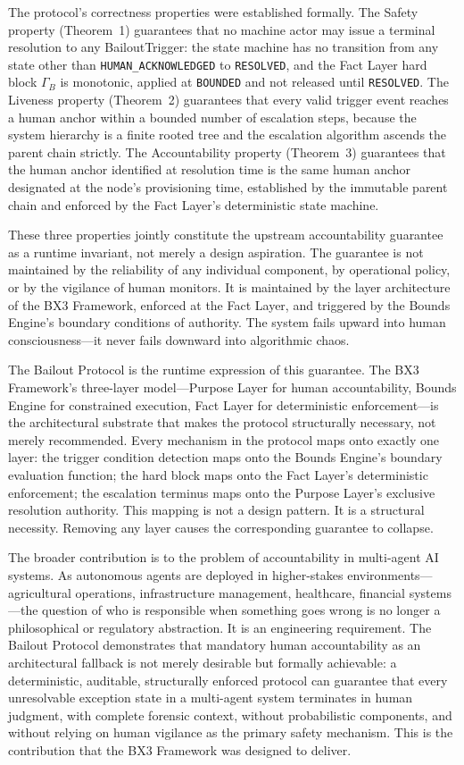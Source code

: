 The protocol's correctness properties were established formally. The Safety property (Theorem~1) guarantees that no machine actor may issue a terminal resolution to any BailoutTrigger: the state machine has no transition from any state other than \texttt{HUMAN\_ACKNOWLEDGED} to \texttt{RESOLVED}, and the Fact Layer hard block $\Gamma_B$ is monotonic, applied at \texttt{BOUNDED} and not released until \texttt{RESOLVED}. The Liveness property (Theorem~2) guarantees that every valid trigger event reaches a human anchor within a bounded number of escalation steps, because the system hierarchy is a finite rooted tree and the escalation algorithm ascends the parent chain strictly. The Accountability property (Theorem~3) guarantees that the human anchor identified at resolution time is the same human anchor designated at the node's provisioning time, established by the immutable parent chain and enforced by the Fact Layer's deterministic state machine.

These three properties jointly constitute the upstream accountability guarantee as a runtime invariant, not merely a design aspiration. The guarantee is not maintained by the reliability of any individual component, by operational policy, or by the vigilance of human monitors. It is maintained by the layer architecture of the BX3 Framework, enforced at the Fact Layer, and triggered by the Bounds Engine's boundary conditions of authority. The system fails upward into human consciousness---it never fails downward into algorithmic chaos.

The Bailout Protocol is the runtime expression of this guarantee. The BX3 Framework's three-layer model---Purpose Layer for human accountability, Bounds Engine for constrained execution, Fact Layer for deterministic enforcement---is the architectural substrate that makes the protocol structurally necessary, not merely recommended. Every mechanism in the protocol maps onto exactly one layer: the trigger condition detection maps onto the Bounds Engine's boundary evaluation function; the hard block maps onto the Fact Layer's deterministic enforcement; the escalation terminus maps onto the Purpose Layer's exclusive resolution authority. This mapping is not a design pattern. It is a structural necessity. Removing any layer causes the corresponding guarantee to collapse.

The broader contribution is to the problem of accountability in multi-agent AI systems. As autonomous agents are deployed in higher-stakes environments---agricultural operations, infrastructure management, healthcare, financial systems---the question of who is responsible when something goes wrong is no longer a philosophical or regulatory abstraction. It is an engineering requirement. The Bailout Protocol demonstrates that mandatory human accountability as an architectural fallback is not merely desirable but formally achievable: a deterministic, auditable, structurally enforced protocol can guarantee that every unresolvable exception state in a multi-agent system terminates in human judgment, with complete forensic context, without probabilistic components, and without relying on human vigilance as the primary safety mechanism. This is the contribution that the BX3 Framework was designed to deliver.